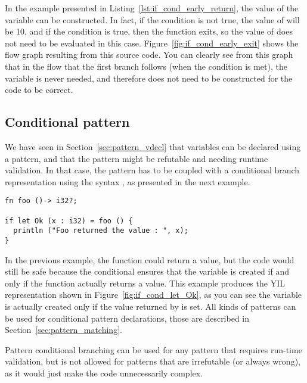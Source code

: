 In the example presented in Listing~\ref{lst:if_cond_early_return}, the value of
the variable  can be constructed. In fact, if the condition is not
true, the value of  will be 10, and if the condition is true, then the
function exits, so the value of  does not need to be evaluated in this
case. Figure~\ref{fig:if_cond_early_exit} shows the flow graph resulting from
this source code. You can clearly see from this graph that in the flow that the
first branch follows (when the condition is met), the variable  is
never needed, and therefore does not need to be constructed for the code to be
correct.


\subsection {Conditional pattern}
\label{sec:cond_pattern}

We have seen in Section~\ref{sec:pattern_vdecl} that variables can be declared
using a pattern, and that the pattern might be refutable and needing runtime
validation. In that case, the pattern has to be coupled with a conditional
branch representation using the syntax , as
presented in the next example.



\begin{lstlisting}[style=coloredverbatim, label=lst:if_cond_let_Ok, caption=Example of conditional pattern]
fn foo ()-> i32?;

if let Ok (x : i32) = foo () {
  println ("Foo returned the value : ", x);
}
\end{lstlisting}

In the previous example, the function  could return a 
value, but the code would still be safe because the conditional ensures that the
variable  is created if and only if the function actually returns a
value. This example produces the YIL representation shown in
Figure~\ref{fig:if_cond_let_Ok}, as you can see the variable  is
actually created only if the value returned by  is set. All kinds of
patterns can be used for conditional pattern declarations, those are described
in Section~\ref{sec:pattern_matching}.


Pattern conditional branching can be used for any pattern that requires run-time
validation, but is not allowed for patterns that are irrefutable (or always
wrong), as it would just make the code unnecessarily complex.

